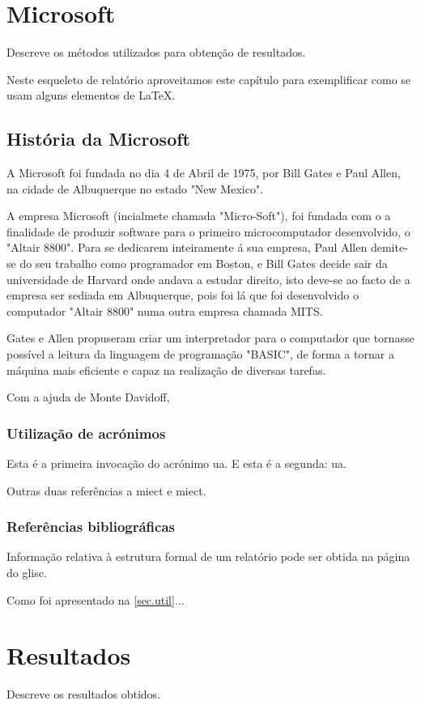\documentclass{report}
\begin{document}
\chapter{Microsoft}
\label{chap.microsoft}
Descreve os métodos utilizados para obtenção de resultados.

Neste esqueleto de relatório aproveitamos este capítulo para exemplificar
como se usam alguns elementos de {\LaTeX}.

\section{História da Microsoft}

A Microsoft foi fundada no dia 4 de Abril de 1975, por Bill Gates e Paul Allen, na cidade de Albuquerque no estado "New Mexico".

A empresa Microsoft (incialmete chamada "Micro-Soft"), foi fundada com o a finalidade de produzir software para o primeiro microcomputador desenvolvido, o "Altair 8800". Para se dedicarem inteiramente á sua empresa, Paul Allen
demite-se do seu trabalho como programador em Boston, e Bill Gates decide sair da universidade de Harvard onde andava a estudar direito, isto deve-se ao facto de a empresa ser sediada em Albuquerque, pois foi lá que foi desenvolvido o computador "Altair 8800" numa outra empresa chamada MITS.

Gates e Allen propuseram criar um interpretador para o computador que tornasse possível a leitura da linguagem de programação "BASIC", de forma a tornar a máquina mais eficiente e capaz na realização de diversas tarefas.

Com a ajuda de Monte Davidoff,
\subsection{Utilização de acrónimos}
\label{sec.util}
Esta é a primeira invocação do acrónimo \ac{ua}.
E esta é a segunda: \ac{ua}.


Outras duas referências a \ac{miect}
e \ac{miect}.

\subsection{Referências bibliográficas}
Informação relativa à estrutura formal de um relatório pode ser obtida
na página do \ac{glisc}\cite{glisc}.

Como foi apresentado na \autoref{sec.util}...

\chapter{Resultados}
\label{chap.resultados}
Descreve os resultados obtidos.
\end{document}
